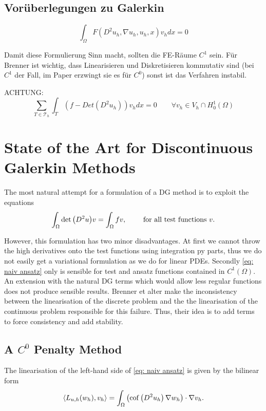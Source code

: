 \subsection*{Vorüberlegungen zu Galerkin}

\[
\int_\Omega F(D^2 u_h, \nabla u_h, u_h, x)v_h dx = 0
\]

Damit diese Formulierung Sinn macht, sollten die FE-Räume $C^1$ sein.
Für Brenner ist wichtig, dass Linearisieren und Diskretisieren kommutativ sind (bei $C^1$ der Fall, im Paper \cite{Brenner2012} erzwingt sie es für $C^0$) sonst ist das Verfahren instabil.

ACHTUNG:
\[
\sum_{T \in \mathcal{T}_h} \int_T(f-Det(D^2 u_h))v_h dx = 0 \qquad \forall v_h \in V_h \cap H_0^1(\Omega)
\]



\section{State of the Art for Discontinuous Galerkin Methods} %

The most natural attempt for a formulation of a DG method is to exploit the equations
\begin{align}
	\int_{\Omega} \det{\left(D^2 u\right)} v = \int_\Omega fv, \qquad \text{ for all test functions } v. \label{eq: naiv ansatz}
\end{align}

However, this formulation has two minor disadvantages. 
At first we cannot throw the high derivatives onto the test functions using integration py parts, thus we do not easily get a variational formulation as we do for linear PDEs. Secondly \eqref{eq: naiv ansatz} only is sensible for test and ansatz functions contained in $C^1(\Omega)$. An extension with the natural DG terms which would allow less regular functions does not produce sensible results. Brenner et alter make the inconsistency between the linearisation of the discrete problem and the the linearisation of the continuous problem responsible \cite{BGN+2011} for this failure. Thus, their idea is to add terms to force consistency and add stability.

\subsection{A $C^0$ Penalty Method }

The linearisation of the left-hand side of \eqref{eq: naiv ansatz} is given by the bilinear form
\begin{align}
\langle L_{u,h}(w_h),v_h\rangle = \int_{\Omega} \left( \operatorname{cof} \left( D^2 u_h \right) \nabla w_h\right) \cdot \nabla v_h. \label{linearOperator}
\end{align}

